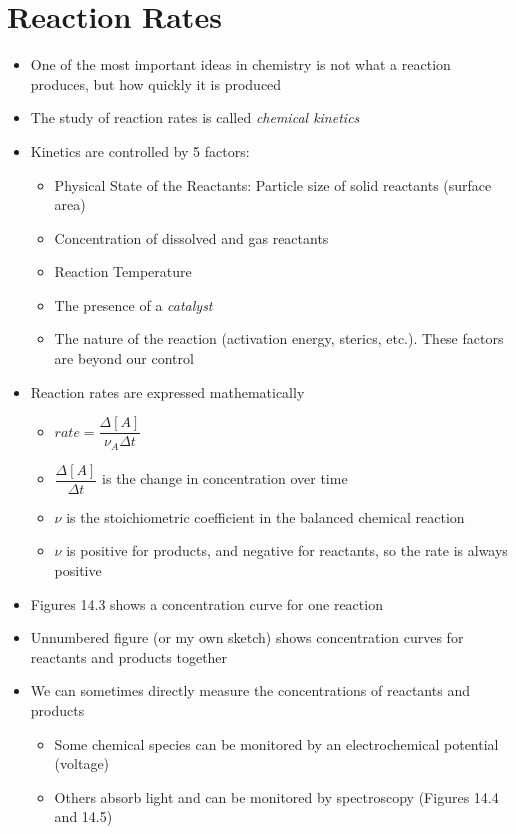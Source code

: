\documentclass[12pt, openany, letterpaper]{memoir}
\begin{document}
\section{Reaction Rates}
\begin{itemize}
	\item One of the most important ideas in chemistry is not what a reaction produces, but how quickly it is produced
	\item The study of reaction rates is called \emph{chemical kinetics}
	\item Kinetics are controlled by 5 factors:
	\begin{itemize}
		\item Physical State of the Reactants: Particle size of solid reactants (surface area)
		\item Concentration of dissolved and gas reactants
		\item Reaction Temperature
		\item The presence of a \emph{catalyst}
		\item The nature of the reaction (activation energy, sterics, etc.). These factors are beyond our control
	\end{itemize}
	\item Reaction rates are expressed mathematically
	\begin{itemize}
		\item $rate=\dfrac{\Delta\left[A\right]}{\nu_A\Delta t}$
		\item $\dfrac{\Delta\left[A\right]}{\Delta t}$ is the change in concentration over time
		\item $\nu$ is the stoichiometric coefficient in the balanced chemical reaction
		\item $\nu$ is positive for products, and negative for reactants, so the rate is always positive
	\end{itemize}
	\item Figures 14.3 shows a concentration curve for one reaction
  \item Unnumbered figure (or my own sketch) shows concentration curves for reactants and products together
	\item We can sometimes directly measure the concentrations of reactants and products
	\begin{itemize}
		\item Some chemical species can be monitored by an electrochemical potential (voltage)
		\item Others absorb light and can be monitored by spectroscopy (Figures 14.4 and 14.5)

\end{itemize}
\end{itemize}
\end{document}
